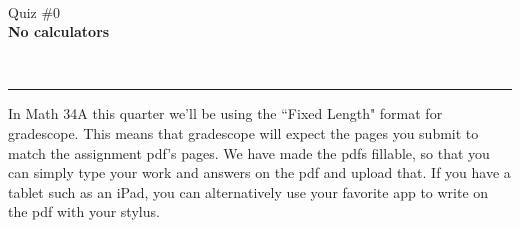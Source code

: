 \documentclass[12pt]{article}
\newcommand{\version}{}
\newcommand{\xzero}{}
\newcommand{\xone}{}
\newcommand{\xtwo}{}
\newcommand{\xthree}{}
\newcommand{\xfour}{}
\newcommand{\xfive}{}
\newcommand{\ExamName}{Quiz \#0\version}
\begin{document}
\renewcommand{\version}{}
\renewcommand{\xzero}{0.0}
\renewcommand{\xone}{1.3}
\renewcommand{\xtwo}{2.9}
\renewcommand{\xthree}{4.1}
\renewcommand{\xfour}{5.3}
\renewcommand{\xfive}{6.5}
% 
\begin{minipage}{0.25\linewidth}
  \CourseName\ \Quarter \\
  \ExamName \\[1em]
  \textbf{No calculators}\\[2em]
\end{minipage}
\hfill
\begin{minipage}[t]{0.4\linewidth}
\end{minipage}
\hfill
\begin{minipage}{0.25\linewidth}
  \vspace*{-3.25em}
  \ \hfill
\end{minipage}
\vspace*{-0.25in}

\hfill
\begin{minipage}{0.5\linewidth}
\end{minipage}
\noindent\hspace*{-2em}\rule{\textwidth+4em}{1pt}%

\mbox{}

In Math 34A this quarter we'll be using the ``Fixed Length" format for gradescope. This means that gradescope will expect the pages you submit to match the assignment pdf's pages. We have made the pdfs fillable, so that you can simply type your work and answers on the pdf and upload that. If you have a tablet such as an iPad, you can alternatively use your favorite app to write on the pdf with your stylus. 
\end{document}
